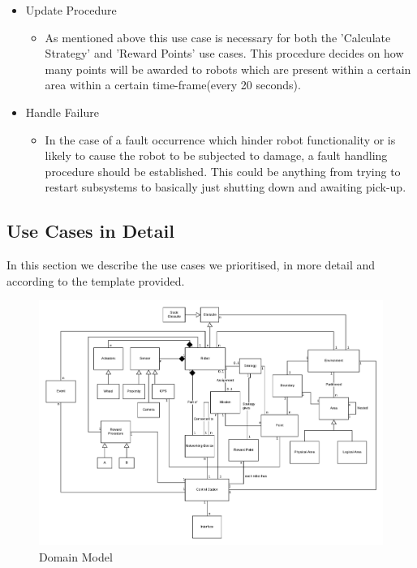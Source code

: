 \begin{itemize}
    \item Update Procedure
      \begin{itemize}
          \item As mentioned above this use case is necessary for both the 'Calculate Strategy' and 'Reward Points' use cases. This procedure decides on how many points will be awarded to robots which are present within a certain area within a certain time-frame(every 20 seconds). 
      \end{itemize}
    \item Handle Failure
      \begin{itemize}
          \item In the case of a fault occurrence which hinder robot functionality or is likely to cause the robot to be subjected to damage, a fault handling procedure should be established. This could be anything from trying to restart subsystems to basically just shutting down and awaiting pick-up.
      \end{itemize}
\end{itemize}
\subsection*{Use Cases in Detail}
In this section we describe the use cases we prioritised, in more detail and according to the template provided.
\newline








\newpage
\begin{figure}
    \centering
    \includegraphics[width=22cm, angle=-90]{docs/domain/model.png}
    \caption{Domain Model}
    \label{fig:domain}
\end{figure}

